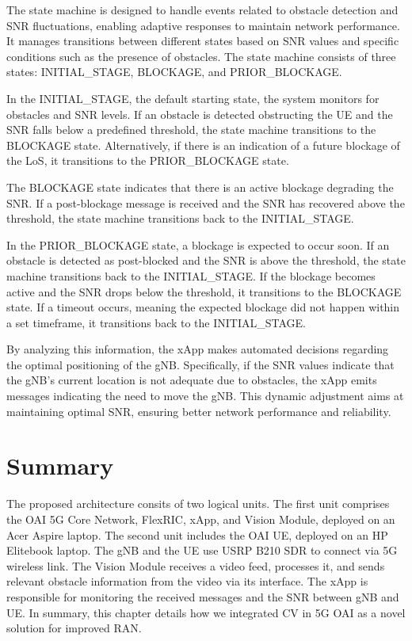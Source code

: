 The state machine is designed to handle events related to obstacle detection and SNR fluctuations, enabling adaptive responses to maintain network performance.
It manages transitions between different states based on SNR values and specific conditions such as the presence of obstacles.
The state machine consists of three states: INITIAL\_STAGE, BLOCKAGE, and PRIOR\_BLOCKAGE\@.

In the INITIAL\_STAGE, the default starting state, the system monitors for obstacles and SNR levels.
If an obstacle is detected obstructing the UE and the SNR falls below a predefined threshold, the state machine transitions to the BLOCKAGE state.
Alternatively, if there is an indication of a future blockage of the LoS, it transitions to the PRIOR\_BLOCKAGE state.

The BLOCKAGE state indicates that there is an active blockage degrading the SNR\@.
If a post-blockage message is received and the SNR has recovered above the threshold, the state machine transitions back to the INITIAL\_STAGE\@.

In the PRIOR\_BLOCKAGE state, a blockage is expected to occur soon.
If an obstacle is detected as post-blocked and the SNR is above the threshold, the state machine transitions back to the INITIAL\_STAGE\@.
If the blockage becomes active and the SNR drops below the threshold, it transitions to the BLOCKAGE state.
If a timeout occurs, meaning the expected blockage did not happen within a set timeframe, it transitions back to the INITIAL\_STAGE.

By analyzing this information, the xApp makes automated decisions regarding the optimal positioning of the gNB\@.
Specifically, if the SNR values indicate that the gNB's current location is not adequate due to obstacles, the xApp emits messages indicating the need to move the gNB\@.
This dynamic adjustment aims at maintaining optimal SNR, ensuring better network performance and reliability.

\section{Summary}\label{sec:summary}
The proposed architecture consits of two logical units.
The first unit comprises the OAI 5G Core Network, FlexRIC, xApp, and Vision Module, deployed on an Acer Aspire laptop.
The second unit includes the OAI UE, deployed on an HP Elitebook laptop.
The gNB and the UE use USRP B210 SDR to connect via 5G wireless link.
The Vision Module receives a video feed, processes it, and sends relevant obstacle information from the video via its interface.
The xApp is responsible for monitoring the received messages and the SNR between gNB and UE\@.
In summary, this chapter details how we integrated CV in 5G OAI as a novel solution for improved RAN\@.







